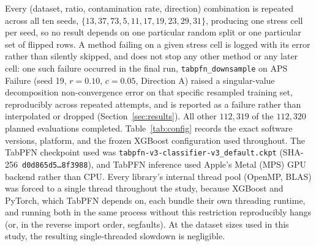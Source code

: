 Every (dataset, ratio, contamination rate, direction) combination is
repeated across all ten seeds, $\{13, 37, 73, 5, 11, 17, 19, 23,
29, 31\}$, producing one stress cell per seed, so no result depends on
one particular random split or one particular set of flipped rows. A
method failing on a given stress cell is
logged with its error rather than silently skipped, and does not stop any
other method or any later cell: one such failure occurred in the final run,
\texttt{tabpfn\_downsample} on APS Failure (seed 19, $r{=}0.10$,
$c{=}0.05$, Direction A) raised a singular-value decomposition
non-convergence error on that specific resampled training set, reproducibly
across repeated attempts, and is reported as a failure rather than
interpolated or dropped (Section~\ref{sec:results}). All other
$112{,}319$ of the $112{,}320$ planned evaluations completed.
Table~\ref{tab:config} records the exact software
versions, platform, and the frozen XGBoost configuration used throughout.
The TabPFN checkpoint used was \texttt{tabpfn-v3-classifier-v3\_default.ckpt}
(SHA-256~\texttt{d0d865d5\ldots8f3988}), and TabPFN inference used Apple's
Metal (MPS) GPU backend rather than CPU. Every library's internal thread
pool (OpenMP, BLAS) was forced to a single thread throughout the study,
because XGBoost and PyTorch, which TabPFN depends on, each bundle their own
threading runtime, and running both in the same process without this
restriction reproducibly hangs (or, in the reverse import order, segfaults).
At the dataset sizes used in this study, the resulting single-threaded
slowdown is negligible.

